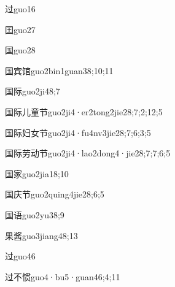 \begin{verbete}{过}{guo1}{6}
\end{verbete}
\begin{verbete}{囯}{guo2}{7}
\end{verbete}
\begin{verbete}{国}{guo2}{8}
\end{verbete}
\begin{verbete}{国宾馆}{guo2bin1guan3}{8;10;11}
\end{verbete}
\begin{verbete}{国际}{guo2ji4}{8;7}
\end{verbete}
\begin{verbete}{国际儿童节}{guo2ji4·er2tong2jie2}{8;7;2;12;5}
\end{verbete}
\begin{verbete}{国际妇女节}{guo2ji4·fu4nv3jie2}{8;7;6;3;5}
\end{verbete}
\begin{verbete}{国际劳动节}{guo2ji4·lao2dong4·jie2}{8;7;7;6;5}
\end{verbete}
\begin{verbete}{国家}{guo2jia1}{8;10}
\end{verbete}
\begin{verbete}{国庆节}{guo2quing4jie2}{8;6;5}
\end{verbete}
\begin{verbete}{国语}{guo2yu3}{8;9}
\end{verbete}
\begin{verbete}{果酱}{guo3jiang4}{8;13}
\end{verbete}
\begin{verbete}{过}{guo4}{6}
\end{verbete}
\begin{verbete}{过不惯}{guo4·bu5·guan4}{6;4;11}
\end{verbete}
